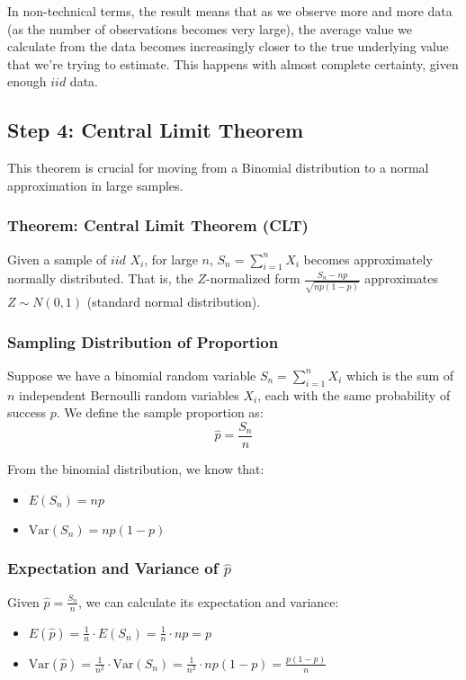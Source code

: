 \documentclass[11pt]{article}
\begin{document}
In non-technical terms, the result means that as we observe more and more data (as the number of observations becomes very large), the average value we calculate from the data becomes increasingly closer to the true underlying value that we're trying to estimate. This happens with almost complete certainty, given enough $iid$ data.

\subsection*{Step 4: Central Limit Theorem}

This theorem is crucial for moving from a Binomial distribution to a normal approximation in large samples.

\subsubsection*{Theorem: Central Limit Theorem (CLT)}
Given a sample of $iid$ $X_i$, for large \(n\), \(S_n	=\sum_{i=1}^{n}X_i\) becomes approximately normally distributed. That is, the $Z$-normalized form \(\frac{S_n - np}{\sqrt{np(1-p)}}\) approximates \(Z \sim N(0, 1)\) (standard normal distribution).


\subsubsection*{Sampling Distribution of Proportion}

Suppose we have a binomial random variable \( S_n = \sum_{i=1}^n X_i \) which is the sum of \( n \) independent Bernoulli random variables \( X_i \), each with the same probability of success \( p \). We define the sample proportion as:
\[ \hat{p} = \frac{S_n}{n} \]

From the binomial distribution, we know that:
\begin{itemize}
    \item \( E(S_n) = np \)
    \item \( \text{Var}(S_n) = np(1-p) \)
\end{itemize}


\subsubsection*{Expectation and Variance of \( \hat{p} \)}
Given \( \hat{p} = \frac{S_n}{n} \), we can calculate its expectation and variance:
\begin{itemize}
    \item \( E(\hat{p}) = \frac{1}{n} \cdot E(S_n) = \frac{1}{n} \cdot np = p \)
    \item \( \text{Var}(\hat{p}) = \frac{1}{n^2} \cdot \text{Var}(S_n) = \frac{1}{n^2} \cdot np(1-p) = \frac{p(1-p)}{n} \)
\end{itemize}
\end{document}
